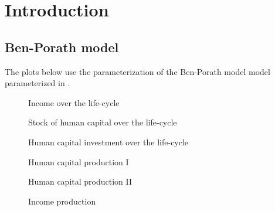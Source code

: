 \section{Introduction}
\FloatBarrier\subsection{Ben-Porath model}

The plots below use the parameterization of the Ben-Porath model \citep{Ben-Porath.1967} model parameterized in \citet{Cahuc.2004}.

\begin{figure}[htp]\centering
\caption{Income over the life-cycle}\label{Income over the life-cycle}
\end{figure}

\begin{figure}[htp]\centering
\caption{Stock of human capital over the life-cycle}
\label{Stock of human capital over the life-cycle}
\end{figure}

\begin{figure}[htp]\centering
\caption{Human capital investment over the life-cycle}
\label{Human capital investment over the life-cycle}
\end{figure}

\begin{figure}[htp]\centering
\caption{Human capital production I}\label{Human capital production I}
\end{figure}

\begin{figure}[htp]\centering
\caption{Human capital production II}\label{Human capital production II}
\end{figure}

\begin{figure}[htp]\centering
\caption{Income production}\label{Income production}
\end{figure}
